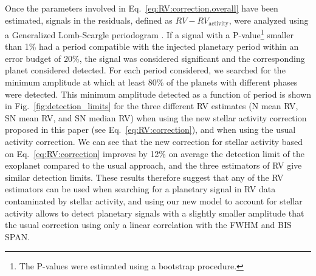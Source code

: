 \documentclass{aa}
\newcommand{\jessi}[1]{{\color{Purple}[[\textbf{Jessi: }#1]]}}
\begin{document}
%

Once the parameters involved in Eq.~\eqref{eq:RV:correction.overall} have been estimated,  signals in the residuals, defined as $RV - RV_{\text{activity}}$, were analyzed using a Generalized Lomb-Scargle periodogram \citep[][]{Lomb-1976a, Scargle-1982, Zechmeister-2009}. 
If a signal with a P-value\footnote{The P-values were estimated using a bootstrap procedure.} smaller than 1\% had a period compatible with the injected planetary period within an error budget of 20\%, the signal was considered significant and the corresponding planet considered detected.  
For each period considered, we searched for the minimum amplitude at which at least 80\% of the planets with different phases were detected.
This minimum amplitude detected as a function of period is shown in Fig.~\ref{fig:detection_limits} for the three different RV estimates (N mean RV, SN mean RV, and SN median RV) when using the new stellar activity correction proposed in this paper (see Eq.~\eqref{eq:RV:correction}), and when using the usual activity correction.
We can see that the new correction for stellar activity based on Eq.~\eqref{eq:RV:correction} improves by 12\% on average the detection limit of the exoplanet compared to the usual approach, and the three estimators of RV give similar detection limits.
These results therefore suggest that any of the RV estimators can be used when searching for a planetary signal in RV data contaminated by stellar activity, and using our new model to account for stellar activity allows to detect planetary signals with a slightly smaller amplitude that the usual correction using only a linear correlation with the FWHM and BIS SPAN.
\end{document}
